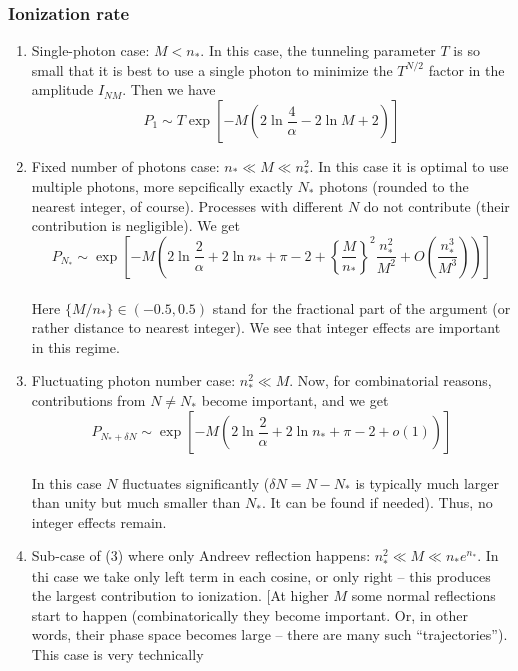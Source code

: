 \subsubsection{Ionization rate}
\begin{enumerate}
	\item Single-photon case: $M<n_{*}$. In this case, the tunneling parameter
	$T$ is so small that it is best to use a single photon to minimize
	the $T^{N/2}$ factor in the amplitude $I_{NM}$. Then we have
	\begin{equation}
	P_{1}\sim T\exp\left[-M\left(2\ln\frac{4}{\alpha}-2\ln M+2\right)\right]
	\end{equation}
	\item Fixed number of photons case: $n_{*}\ll M\ll n_{*}^{2}$. In this
	case it is optimal to use multiple photons, more sepcifically exactly
	$N_{*}$ photons (rounded to the nearest integer, of course). Processes
	with different $N$ do not contribute (their contribution is negligible).
	We get
	\begin{equation}
	P_{N_{*}}\sim\exp\left[-M\left(2\ln\frac{2}{\alpha}+2\ln n_{*}+\pi-2+\left\{ \frac{M}{n_{*}}\right\} ^{2}\frac{n_{*}^{2}}{M^{2}}+O\left(\frac{n_{*}^{3}}{M^{3}}\right)\right)\right]
	\end{equation}
	\\
	Here $\{M/n_{*}\}\in(-0.5,0.5)$ stand for the fractional part of
	the argument (or rather distance to nearest integer). We see that
	integer effects are important in this regime.
	\item Fluctuating photon number case: $n_{*}^{2}\ll M$. Now, for combinatorial
	reasons, contributions from $N\neq N_{*}$ become important, and we
	get
	\begin{equation}
	P_{N_{*}+\delta N}\sim\exp\left[-M\left(2\ln\frac{2}{\alpha}+2\ln n_{*}+\pi-2+o(1)\right)\right]
	\end{equation}
	\\
	In this case $N$ fluctuates significantly ($\delta N=N-N_{*}$ is
	typically much larger than unity but much smaller than $N_{*}$. It
	can be found if needed). Thus, no integer effects remain.
	\item Sub-case of (3) where only Andreev reflection happens: $n_{*}^{2}\ll M\ll n_{*}e^{n_{*}}.$
	In thi case we take only left term in each cosine, or only right --
	this produces the largest contribution to ionization. {[}At higher
	$M$ some normal reflections start to happen (combinatorically they
	become important. Or, in other words, their phase space becomes large
	-- there are many such ``trajectories''). This case is very technically

\end{enumerate}
